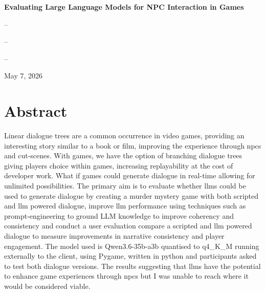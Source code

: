 \documentclass[12pt, a4paper]{report}
\begin{document}
	\begin{titlepage}
		\centering
		
		\vspace*{1cm}
		
		\Huge\textbf{Evaluating Large Language Models for NPC Interaction in Games}
		
		\vfill
		
		\large
		
		 – 
		
		 – 
		
		 – 
		
		\vspace{1cm}
		
		May 7, 2026
		
		\vspace{2cm}
	\end{titlepage}
	
	
	\chapter*{Abstract}
	Linear dialogue trees are a common occurrence in video games, providing an interesting story similar to a book or film, improving the experience through \gls{npc}s and cut-scenes. With games, we have the option of branching dialogue trees giving players choice within games, increasing replayability at the cost of developer work. What if games could generate dialogue in real-time allowing for unlimited possibilities. The primary aim is to evaluate whether \gls{llm}s could be used to generate dialogue by creating a murder mystery game with both scripted and \gls{llm} powered dialogue, improve \gls{llm} performance using techniques such as prompt-engineering to ground LLM knowledge to improve coherency and consistency and conduct a user evaluation compare a scripted and \gls{llm} powered dialogue to measure improvements in narrative consistency and player engagement. The model used is Qwen3.6-35b-a3b quantised to q4\_K\_M running externally to the client, using Pygame, written in python and participants asked to test both dialogue versions. The results suggesting that \gls{llm}s have the potential to enhance game experiences through \gls{npc}s but I was unable to reach where it would be considered viable.
	
\end{document}
